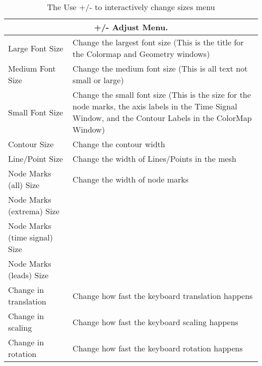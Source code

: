 \begin{table}[ht]
  \begin{center}
    \begin{tabular}{|l|p{4in}|} \hline
      \multicolumn{2}{|c|}{\textbf{+/-  Adjust Menu.}} \\ \hline \hline
      Large Font Size & Change the largest font size (This is the title
    for the Colormap and Geometry windows) \\ 
      Medium Font Size & Change the medium font size (This is all text
    not small or large) \\ 
      Small Font Size & Change the small font size (This is the size for
    the node marks, the axis labels in the Time Signal Window, and the
    Contour Labels in the ColorMap Window) \\ 
      Contour Size & Change the contour width \\
      Line/Point Size & Change the width of Lines/Points in the mesh \\
      Node Marks (all) Size & Change the width of node marks \\
      Node Marks (extrema) Size & \\
      Node Marks (time signal) Size & \\
      Node Marks (leads) Size & \\
      Change in translation & Change how fast the keyboard translation
    happens \\ 
      Change in scaling & Change how fast the keyboard scaling happens \\
      Change in rotation & Change how fast the keyboard rotation happens
      \\ \hline 
    \end{tabular}
  \end{center}
\caption{The Use +/- to interactively change sizes menu}
\end{table}




